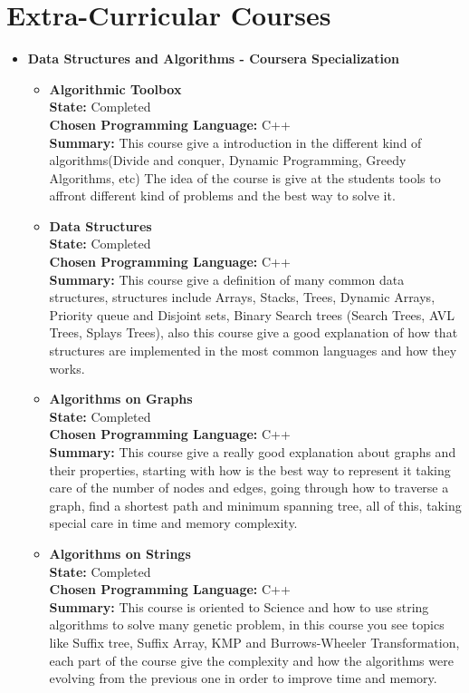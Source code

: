 \documentclass[a4paper,10pt]{article} %
\begin{document}
\section{Extra-Curricular Courses}
\begin{itemize}
\item \textbf{Data Structures and Algorithms - Coursera Specialization}\\
\begin{itemize}
\item \textbf{Algorithmic Toolbox}\\
\textbf{State:} Completed\\
\textbf{Chosen Programming Language:} C++\\
\textbf{Summary:} This course give a introduction in the different kind of algorithms(Divide and conquer, Dynamic Programming, Greedy Algorithms, etc) The idea of the course is give at the students tools to affront different kind of problems and the best way to solve it.\\
\item \textbf{Data Structures}\\
\textbf{State:} Completed\\
\textbf{Chosen Programming Language:} C++\\
\textbf{Summary:} This course give a definition of many common data structures, structures include Arrays, Stacks, Trees, Dynamic Arrays, Priority queue and Disjoint sets, Binary Search trees (Search Trees, AVL Trees, Splays Trees), also this course give a good explanation of how that structures are implemented in the most common languages and how they works.\\
\item \textbf{Algorithms on Graphs}\\
\textbf{State:} Completed\\
\textbf{Chosen Programming Language:} C++\\
\textbf{Summary:} This course give a really good explanation about graphs and their properties, starting with how is the best way to represent it taking care of the number of nodes and edges, going through how to traverse a graph, find a shortest path and minimum spanning tree, all of this, taking special care in time and memory complexity.
\item \textbf{Algorithms on Strings}\\
\textbf{State:} Completed\\
\textbf{Chosen Programming Language:} C++\\
\textbf{Summary:} This course is oriented to Science and how to use string algorithms to solve many genetic problem, in this course you see topics like Suffix tree, Suffix Array, KMP and Burrows-Wheeler Transformation,  each part of the course give the complexity and how the algorithms were evolving from the previous one in order to improve time and memory.

\end{itemize}
\end{itemize}
\end{document}
